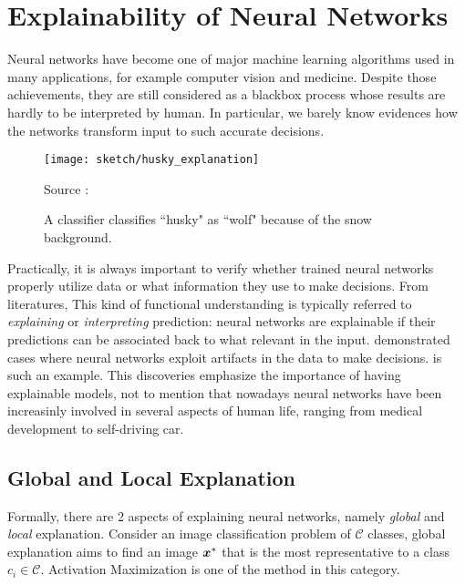 \section{Explainability of Neural Networks}
Neural networks have become one of major machine learning algorithms used in many applications, for example computer vision and medicine. Despite those achievements, they are still considered as a blackbox process whose results are hardly to be interpreted by human. In particular, we barely know evidences how the networks transform input to such accurate decisions.


%  
%
%


 \begin{figure}[!hbt]
	 		\centering
			\texttt{[image: sketch/husky\_explanation]}
			\caption{A classifier classifies ``husky" as ``wolf" because of the snow background.}
			  \small{ Source : \cite{RibeiroWhyShouldTrust2016} }
			\label{fig:husky_explanation}
\end{figure}


Practically, it is always important to verify whether trained neural networks properly utilize data or what information they use to make decisions. From literatures, This kind of functional understanding is typically referred to \textit{explaining} or \textit{interpreting} prediction: neural networks are explainable if their predictions can be associated back to what relevant in the input. \cite{BachAnalyzingclassifiersFisher2016, RibeiroWhyShouldTrust2016} demonstrated cases where neural networks exploit artifacts in the data to make decisions. \addfigure{\ref{fig:husky_explanation}} is such an example. This discoveries emphasize the importance of having explainable models, not to mention that nowadays neural networks have been increasinly involved in several aspects of human life, ranging from medical development to self-driving car. 

\subsection{Global and Local Explanation}\label{sec:global_local_explanation}
Formally, there are 2 aspects of explaining neural networks, namely \textit{global} and \textit{local} explanation. Consider an image  classification problem of $\mathcal{C}$ classes, global explanation aims to find an image $\patvector{x}^*$ that is the most representative to a class $c_i \in \mathcal{C}$. Activation Maximization\cite{ErhanUnderstandingRepresentationsLearned2010} is one of the method in this category.

